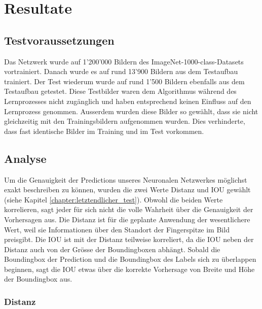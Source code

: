 \newpage
\section{Resultate}
\label{chapter:resultate}
\subsection{Testvoraussetzungen}
Das Netzwerk wurde auf 1'200'000 Bildern des ImageNet-1000-class-Datasets vortrainiert.
Danach wurde es auf rund 13'900 Bildern aus dem Testaufbau \cite{TabeasFingertracking} trainiert. 
Der Test wiederum wurde auf rund 1'500 Bildern ebenfalls aus dem Testaufbau \cite{TabeasFingertracking} getestet. 
Diese Testbilder waren dem Algorithmus während des Lernprozesses nicht zugänglich und haben entsprechend keinen Einfluss auf den Lernprozess genommen. 
Ausserdem wurden diese Bilder so gewählt, dass sie nicht gleichzeitig mit den Trainingsbildern aufgenommen wurden. 
Dies verhinderte, dass fast identische Bilder im Training und im Test vorkommen. 

\subsection{Analyse}
Um die Genauigkeit der Predictions unseres Neuronalen Netzwerkes möglichst exakt beschreiben zu können, wurden die zwei Werte Distanz und IOU gewählt (siehe Kapitel \ref{chapter:letztendlicher_test}). 
Obwohl die beiden Werte korrelieren, sagt jeder für sich nicht die volle Wahrheit über die Genauigkeit der Vorhersagen aus. 
Die Distanz ist für die geplante Anwendung der wesentlichere Wert, weil sie Informationen über den Standort der Fingerspitze im Bild preisgibt.
Die IOU ist mit der Distanz teilweise korreliert, da die IOU neben der Distanz auch von der Grösse der Boundingboxen abhängt.
Sobald die Boundingbox der Prediction und die Boundingbox des Labels sich zu überlappen beginnen, sagt die IOU etwas über die korrekte Vorhersage von Breite und Höhe der Boundingbox aus.

\subsubsection{Distanz}

